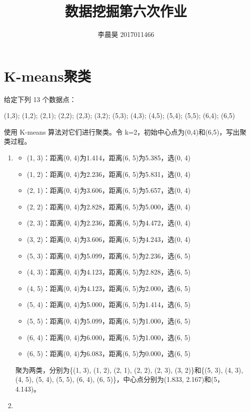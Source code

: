 \documentclass[12pt, UTF8]{article}
\title{数据挖掘第六次作业}
\author{李晨昊 2017011466}
\begin{document}
\maketitle
\tableofcontents

\section{K-means聚类}

给定下列 13 个数据点：

(1,3); (1,2); (2,1); (2,2); (2,3); (3,2); (5,3); (4,3); (4,5); (5,4); (5,5); (6,4); (6,5)

使用 K-means 算法对它们进行聚类。令 k=2，初始中心点为(0,4)和(6,5)，写出聚类过程。

\begin{enumerate}[label = Iter \arabic*:]
  \item
  \begin{itemize}
    \item (1, 3)：距离(0, 4)为1.414，距离(6, 5)为5.385，选(0, 4)
    \item (1, 2)：距离(0, 4)为2.236，距离(6, 5)为5.831，选(0, 4)
    \item (2, 1)：距离(0, 4)为3.606，距离(6, 5)为5.657，选(0, 4)
    \item (2, 2)：距离(0, 4)为2.828，距离(6, 5)为5.000，选(0, 4)
    \item (2, 3)：距离(0, 4)为2.236，距离(6, 5)为4.472，选(0, 4)
    \item (3, 2)：距离(0, 4)为3.606，距离(6, 5)为4.243，选(0, 4)
    \item (5, 3)：距离(0, 4)为5.099，距离(6, 5)为2.236，选(6, 5)
    \item (4, 3)：距离(0, 4)为4.123，距离(6, 5)为2.828，选(6, 5)
    \item (4, 5)：距离(0, 4)为4.123，距离(6, 5)为2.000，选(6, 5)
    \item (5, 4)：距离(0, 4)为5.000，距离(6, 5)为1.414，选(6, 5)
    \item (5, 5)：距离(0, 4)为5.099，距离(6, 5)为1.000，选(6, 5)
    \item (6, 4)：距离(0, 4)为6.000，距离(6, 5)为1.000，选(6, 5)
    \item (6, 5)：距离(0, 4)为6.083，距离(6, 5)为0.000，选(6, 5)
  \end{itemize}
  聚为两类，分别为\{(1, 3), (1, 2), (2, 1), (2, 2), (2, 3), (3, 2)\}和\{(5, 3), (4, 3), (4, 5), (5, 4), (5, 5), (6, 4), (6, 5)\}，中心点分别为(1.833, 2.167)和(5， 4.143)。
  \item
  \begin{itemize}

\end{itemize}
\end{enumerate}
\end{document}
